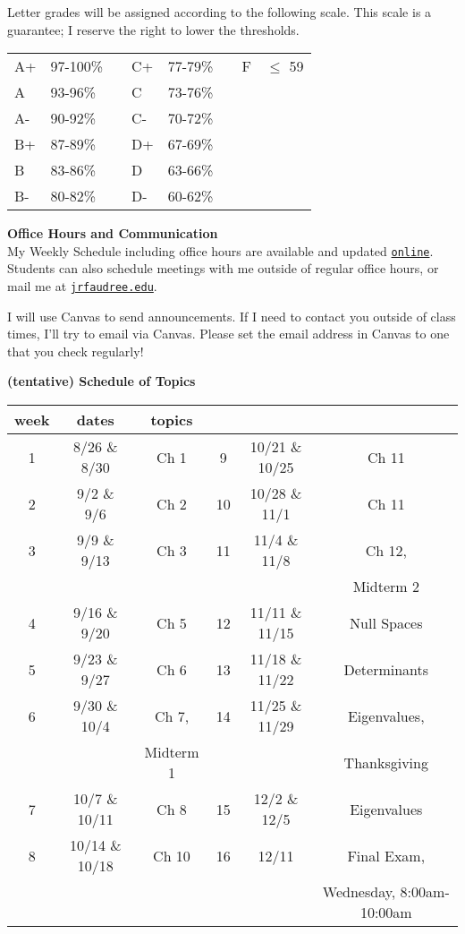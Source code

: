 \documentclass[12pt]{article}
\renewcommand{\emph}[1]{\textsf{\textbf{#1}}}
\newcommand{\localhead}[1]{\par\smallskip\textbf{#1}\nobreak\\}%
\def\heading#1{\localhead{\large\emph{#1}}}
\begin{document}
\begin{multicols}{2}
Letter grades will be assigned according to the following scale. This scale is a guarantee; I reserve the right to lower the thresholds.

\begin{tabular}{| llllllll |}
\hline
A+&97-100\%& \hspace{.1in}&C+&77-79\%& \hspace{.1in}&F&$\leq$ 59\\
A&93-96\%&&C&73-76\%&&&\\
A-&90-92\%&&C-&70-72\%&&&\\
B+&87-89\%& \hspace{.1in}&D+&67-69\%&&&\\
B&83-86\%&&D&63-66\%&&&\\
B-&80-82\%&&D-&60-62\%&&&\\
\hline
\end{tabular} 

\end{multicols}

\heading{Office Hours and Communication}
My Weekly Schedule including office hours are available and updated \href{https://docs.google.com/spreadsheets/d/1o710N0-GCNc8ICkVuf-IIC80N04p9w9wGnPADjhTMv0/pubhtml}{\texttt{online}}.  Students can also schedule meetings with me outside of regular office hours, or mail me at \href{mailto:jrfaudree@alaska.edu}{\texttt{jrfaudree\@@alaska.edu}}.

I will use Canvas to send announcements.  If I need to contact you outside of class times, I'll try to email via Canvas.  Please set the email address in Canvas to one that you check regularly!



\begin{center}
\textbf{(tentative) Schedule of Topics}\\

\begin{tabular}{c | c | c || c | c | c}
week & dates &topics \\
\hline \hline
1& 8/26 \& 8/30 &Ch 1 &9& 10/21 \& 10/25 &Ch 11 \\ \hline
2& 9/2 \& 9/6& Ch 2 & 10& 10/28 \& 11/1& Ch 11\\ \hline
3& 9/9 \& 9/13 & Ch 3 & 11& 11/4 \& 11/8& Ch 12, \\
&&&&&Midterm 2\\ \hline
4& 9/16 \& 9/20 & Ch 5 & 12& 11/11 \& 11/15& Null Spaces\\ \hline
5& 9/23 \& 9/27& Ch 6 & 13& 11/18 \& 11/22& Determinants \\ \hline
6& 9/30 \& 10/4& Ch 7, &14& 11/25 \& 11/29&Eigenvalues, \\
&&Midterm 1 &&&Thanksgiving\\ \hline
7& 10/7 \& 10/11& Ch 8 & 15& 12/2 \& 12/5&Eigenvalues\\ \hline
8& 10/14 \& 10/18& Ch 10 & 16& 12/11& Final Exam, \\
&&&&&Wednesday, 8:00am-10:00am\\ \hline
\end{tabular}
\end{center}
\end{document}
